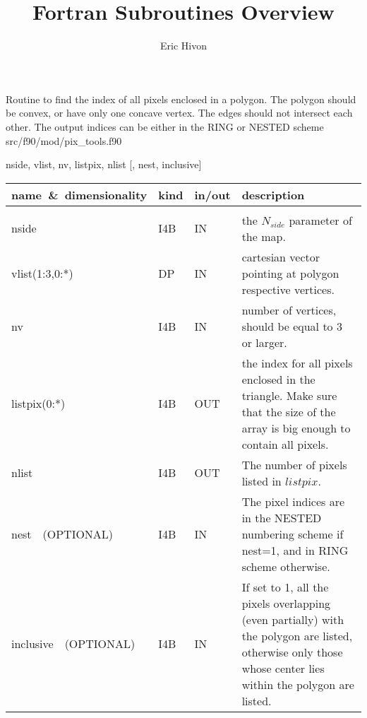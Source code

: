 
\sloppy


\title{\healpix Fortran Subroutines Overview}
 \section[query\_polygon]{ }
\label{sub:query_polygon}
\author{Eric Hivon}

\begin{facility}
{Routine to find the index of all pixels enclosed in a polygon. The polygon should be convex, 
or have only one concave vertex. The edges should not intersect each other. 
The output indices can be either in the RING or NESTED scheme} 
{src/f90/mod/pix\_tools.f90}
\end{facility}

\begin{f90format}
{nside, vlist, nv, listpix, nlist [, nest, inclusive]}
\end{f90format}

\begin{arguments}
{
\begin{tabular}{p{0.25\hsize} p{0.05\hsize} p{0.1\hsize} p{0.5\hsize}} \hline  
\textbf{name~\&~dimensionality} & \textbf{kind} & \textbf{in/out} & \textbf{description} \\ \hline
                   &   &   &                           \\ %
nside & I4B & IN & the $N_{side}$ parameter of the map. \\
vlist(1:3,0:*) & DP & IN & cartesian vector pointing at polygon
                   respective vertices. \\
nv & I4B & IN & number of vertices, should be equal to 3 or larger. \\
listpix(0:*) & I4B & OUT & the index for all pixels enclosed in the triangle. Make sure that the size of the array is big enough to contain all pixels. \\ 
nlist & I4B & OUT & The number of pixels listed in $listpix$. \\
nest\ \ (OPTIONAL) & I4B & IN &  The pixel indices are in the NESTED numbering scheme if nest=1, and in RING scheme otherwise. \\
inclusive\ \ (OPTIONAL) & I4B & IN & If set to 1, all the pixels overlapping
                   (even partially)
                   with the polygon are listed, otherwise only those whose
                   center lies within the polygon are listed. \\
\end{tabular}
}
\end{arguments}

